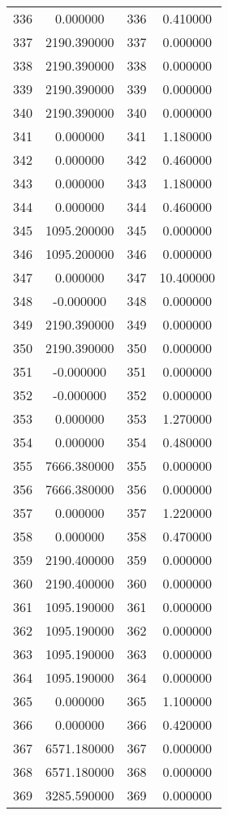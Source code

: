 \documentclass[12pt]{article}
\begin{document}
\begin{longtable}{@{}cccc@{}}
336 & 0.000000 & 336 & 0.410000 \\
337 & 2190.390000 & 337 & 0.000000 \\
338 & 2190.390000 & 338 & 0.000000 \\
339 & 2190.390000 & 339 & 0.000000 \\
340 & 2190.390000 & 340 & 0.000000 \\
341 & 0.000000 & 341 & 1.180000 \\
342 & 0.000000 & 342 & 0.460000 \\
343 & 0.000000 & 343 & 1.180000 \\
344 & 0.000000 & 344 & 0.460000 \\
345 & 1095.200000 & 345 & 0.000000 \\
346 & 1095.200000 & 346 & 0.000000 \\
347 & 0.000000 & 347 & 10.400000 \\
348 & -0.000000 & 348 & 0.000000 \\
349 & 2190.390000 & 349 & 0.000000 \\
350 & 2190.390000 & 350 & 0.000000 \\
351 & -0.000000 & 351 & 0.000000 \\
352 & -0.000000 & 352 & 0.000000 \\
353 & 0.000000 & 353 & 1.270000 \\
354 & 0.000000 & 354 & 0.480000 \\
355 & 7666.380000 & 355 & 0.000000 \\
356 & 7666.380000 & 356 & 0.000000 \\
357 & 0.000000 & 357 & 1.220000 \\
358 & 0.000000 & 358 & 0.470000 \\
359 & 2190.400000 & 359 & 0.000000 \\
360 & 2190.400000 & 360 & 0.000000 \\
361 & 1095.190000 & 361 & 0.000000 \\
362 & 1095.190000 & 362 & 0.000000 \\
363 & 1095.190000 & 363 & 0.000000 \\
364 & 1095.190000 & 364 & 0.000000 \\
365 & 0.000000 & 365 & 1.100000 \\
366 & 0.000000 & 366 & 0.420000 \\
367 & 6571.180000 & 367 & 0.000000 \\
368 & 6571.180000 & 368 & 0.000000 \\
369 & 3285.590000 & 369 & 0.000000 \\

\end{longtable}
\end{document}

